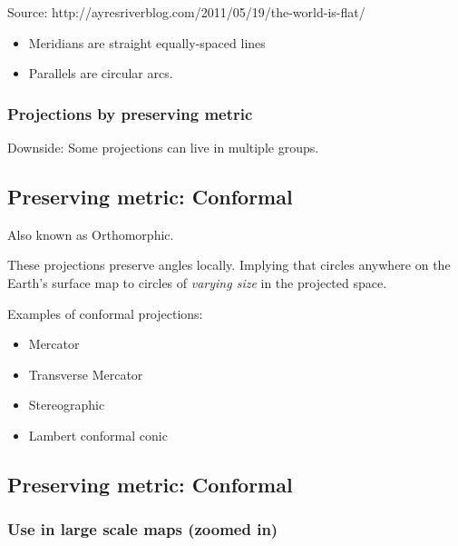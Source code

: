 \documentclass[11pt]{article}
\providecommand{\tightlist}{%
      \setlength{\itemsep}{0pt}\setlength{\parskip}{0pt}}
\begin{document}
Source: http://ayresriverblog.com/2011/05/19/the-world-is-flat/

\begin{itemize}
\tightlist
\item
  Meridians are straight equally-spaced lines
\item
  Parallels are circular arcs.
\end{itemize}

    \hypertarget{projections-by-preserving-metric}{%
\subsubsection{Projections by preserving
metric}\label{projections-by-preserving-metric}}

Downside: Some projections can live in multiple groups.

    \hypertarget{preserving-metric-conformal}{%
\subsection{Preserving metric:
Conformal}\label{preserving-metric-conformal}}

Also known as Orthomorphic.

These projections preserve angles locally. Implying that circles
anywhere on the Earth's surface map to circles of \emph{varying size} in
the projected space.

Examples of conformal projections:

\begin{itemize}
\tightlist
\item
  Mercator
\item
  Transverse Mercator
\item
  Stereographic
\item
  Lambert conformal conic
\end{itemize}

    \hypertarget{preserving-metric-conformal}{%
\subsection{Preserving metric:
Conformal}\label{preserving-metric-conformal}}

\hypertarget{use-in-large-scale-maps-zoomed-in}{%
\subsubsection{Use in large scale maps (zoomed
in)}\label{use-in-large-scale-maps-zoomed-in}}
\end{document}
